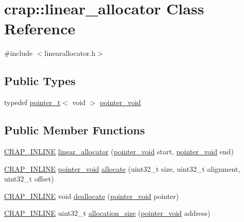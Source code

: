 \hypertarget{classcrap_1_1linear__allocator}{}\section{crap\+:\+:linear\+\_\+allocator Class Reference}
\label{classcrap_1_1linear__allocator}


{\ttfamily \#include $<$linearallocator.\+h$>$}

\subsection*{Public Types}
\begin{DoxyCompactItemize}
\item 
typedef \hyperlink{structcrap_1_1pointer__t}{pointer\+\_\+t}$<$ void $>$ \hyperlink{classcrap_1_1linear__allocator_a1caef970a097c32e6266ba996d42b8de}{pointer\+\_\+void}
\end{DoxyCompactItemize}
\subsection*{Public Member Functions}
\begin{DoxyCompactItemize}
\item 
\hyperlink{config__x86_8h_a5a40526b8d842e7ff731509998bb0f1c}{C\+R\+A\+P\+\_\+\+I\+N\+L\+I\+N\+E} \hyperlink{classcrap_1_1linear__allocator_a172dc88215455f34b047121ddb23ed19}{linear\+\_\+allocator} (\hyperlink{classcrap_1_1linear__allocator_a1caef970a097c32e6266ba996d42b8de}{pointer\+\_\+void} start, \hyperlink{classcrap_1_1linear__allocator_a1caef970a097c32e6266ba996d42b8de}{pointer\+\_\+void} end)
\item 
\hyperlink{config__x86_8h_a5a40526b8d842e7ff731509998bb0f1c}{C\+R\+A\+P\+\_\+\+I\+N\+L\+I\+N\+E} \hyperlink{classcrap_1_1linear__allocator_a1caef970a097c32e6266ba996d42b8de}{pointer\+\_\+void} \hyperlink{classcrap_1_1linear__allocator_a5c83cd8e412b0fd869c0db033f30bde2}{allocate} (uint32\+\_\+t size, uint32\+\_\+t alignment, uint32\+\_\+t offset)
\item 
\hyperlink{config__x86_8h_a5a40526b8d842e7ff731509998bb0f1c}{C\+R\+A\+P\+\_\+\+I\+N\+L\+I\+N\+E} void \hyperlink{classcrap_1_1linear__allocator_ad24fca761b1e5a8efcad88dd49289eef}{deallocate} (\hyperlink{classcrap_1_1linear__allocator_a1caef970a097c32e6266ba996d42b8de}{pointer\+\_\+void} pointer)
\item 
\hyperlink{config__x86_8h_a5a40526b8d842e7ff731509998bb0f1c}{C\+R\+A\+P\+\_\+\+I\+N\+L\+I\+N\+E} uint32\+\_\+t \hyperlink{classcrap_1_1linear__allocator_ab20cb4ab268ebe9907bbc65e0281203e}{allocation\+\_\+size} (\hyperlink{classcrap_1_1linear__allocator_a1caef970a097c32e6266ba996d42b8de}{pointer\+\_\+void} address)
\end{DoxyCompactItemize}


